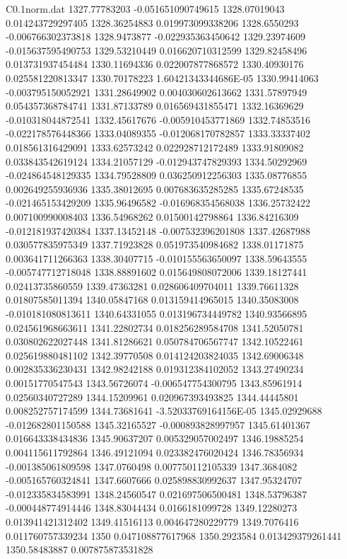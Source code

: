 \begin{filecontents}{C0.1norm.dat}
1327.77783203		-0.051651090749615
1328.07019043		0.014243729297405
1328.36254883		0.019973099338206
1328.6550293		-0.006766302373818
1328.9473877		-0.022935363450642
1329.23974609		-0.015637595490753
1329.53210449		0.016620710312599
1329.82458496		0.013731937454484
1330.11694336		0.022007877868572
1330.40930176		0.025581220813347
1330.70178223		1.60421343344686E-05
1330.99414063		-0.003795150052921
1331.28649902		0.004030602613662
1331.57897949		0.054357368784741
1331.87133789		0.016569431855471
1332.16369629		-0.010318044872541
1332.45617676		-0.005910453771869
1332.74853516		-0.022178576448366
1333.04089355		-0.012068170782857
1333.33337402		0.018561316429091
1333.62573242		0.022928712172489
1333.91809082		0.033843542619124
1334.21057129		-0.012943747829393
1334.50292969		-0.024864548129335
1334.79528809		0.036250912256303
1335.08776855		0.002649255936936
1335.38012695		0.007683635285285
1335.67248535		-0.021465153429209
1335.96496582		-0.016968354568038
1336.25732422		0.007100990008403
1336.54968262		0.01500142798864
1336.84216309		-0.012181937420384
1337.13452148		-0.007532396201808
1337.42687988		0.030577835975349
1337.71923828		0.051973540984682
1338.01171875		0.003641711266363
1338.30407715		-0.010155563650097
1338.59643555		-0.005747712718048
1338.88891602		0.015649808072006
1339.18127441		0.02413735860559
1339.47363281		0.028606409704011
1339.76611328		0.01807585011394
1340.05847168		0.013159414965015
1340.35083008		-0.010181080813611
1340.64331055		0.013196734449782
1340.93566895		0.024561968663611
1341.22802734		0.018256289584708
1341.52050781		0.030802622027448
1341.81286621		0.050784706567747
1342.10522461		0.025619880481102
1342.39770508		0.014124203824035
1342.69006348		0.002835336230431
1342.98242188		0.019312384102052
1343.27490234		0.00151770547543
1343.56726074		-0.006547754300795
1343.85961914		0.02560340727289
1344.15209961		0.020967393493825
1344.44445801		0.008252757174599
1344.73681641		-3.52033769164156E-05
1345.02929688		-0.012682801150588
1345.32165527		-0.000893828997957
1345.61401367		0.016643338434836
1345.90637207		0.005329057002497
1346.19885254		0.004115611792864
1346.49121094		0.023382476020424
1346.78356934		-0.001385061809598
1347.0760498		0.007750112105339
1347.3684082		-0.005165760324841
1347.6607666		0.025898830992637
1347.95324707		-0.012335834583991
1348.24560547		0.021697506500481
1348.53796387		-0.000448774914446
1348.83044434		0.0166181099728
1349.12280273		0.013941421312402
1349.41516113		0.004647280229779
1349.7076416		0.011760757339234
1350		0.047108877617968
1350.2923584		0.013429379261441
1350.58483887		0.007875873531828

\end{filecontents}
